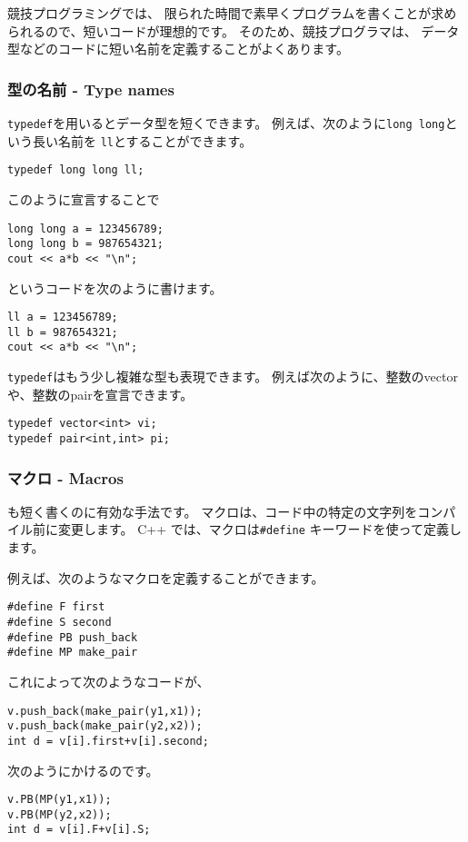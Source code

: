 競技プログラミングでは、
限られた時間で素早くプログラムを書くことが求められるので、短いコードが理想的です。
そのため、競技プログラマは、
データ型などのコードに短い名前を定義することがよくあります。

\subsubsection{型の名前 - Type names}
\texttt{typedef}を用いるとデータ型を短くできます。
例えば、次のように\texttt{long long}という長い名前を
\texttt{ll}とすることができます。

\begin{lstlisting}
typedef long long ll;
\end{lstlisting}

このように宣言することで
\begin{lstlisting}
long long a = 123456789;
long long b = 987654321;
cout << a*b << "\n";
\end{lstlisting}
というコードを次のように書けます。
\begin{lstlisting}
ll a = 123456789;
ll b = 987654321;
cout << a*b << "\n";
\end{lstlisting}

\texttt{typedef}はもう少し複雑な型も表現できます。
例えば次のように、整数のvectorや、整数のpairを宣言できます。
\begin{lstlisting}
typedef vector<int> vi;
typedef pair<int,int> pi;
\end{lstlisting}

\subsubsection{マクロ -  Macros}

も短く書くのに有効な手法です。
マクロは、コード中の特定の文字列をコンパイル前に変更します。
C++ では、マクロは\texttt{\#define} キーワードを使って定義します。

例えば、次のようなマクロを定義することができます。
\begin{lstlisting}
#define F first
#define S second
#define PB push_back
#define MP make_pair
\end{lstlisting}

これによって次のようなコードが、
\begin{lstlisting}
v.push_back(make_pair(y1,x1));
v.push_back(make_pair(y2,x2));
int d = v[i].first+v[i].second;
\end{lstlisting}
次のようにかけるのです。
\begin{lstlisting}
v.PB(MP(y1,x1));
v.PB(MP(y2,x2));
int d = v[i].F+v[i].S;
\end{lstlisting}

